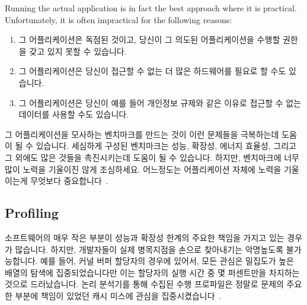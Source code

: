 Running the actual application is in fact the best approach where it is practical.
Unfortunately, it is often impractical for the following reasons:
\fi

\begin{enumerate}
\item	그 어플리케이션은 독점된 것이고, 당신이 그 의도된 어플리케이션을 수행할
	권한을 갖고 있지 못할 수 있습니다.
\item	그 어플리케이션은 당신이 접근할 수 없는 더 많은 하드웨어를 필요로 할
	수도 있습니다.
\item	그 어플리케이션은 당신이 예를 들어 개인정보 규제와 같은 이유로 접근할
	수 없는 데이터를 사용할 수도 있습니다.

\end{enumerate}

그 어플리케이션을 모사하는 벤치마크를 만드는 것이 이런 문제들을 극복하는데
도움이 될 수 있습니다.
세심하게 구성된 벤치마크는 성능, 확장성, 에너지 효율성, 그리고 그 외에도 많은
것들을 촉진시키는데 도움이 될 수 있습니다.
하지만, 벤치마크에 너무 많이 노력을 기울이진 않게 조심하세요.
어느정도는 어플리케이션 자체에 노력을 기울이는게 무엇보다
중요합니다~\cite{Gray91}.

\subsection{Profiling}
\label{sec:debugging:Profiling}

소프트웨어의 매우 작은 부분이 성능과 확장성 한계의 주요한 책임을 가지고 있는
경우가 많습니다.
하지만, 개발자들이 실제 병목지점을 손으로 찾아내기는 악명높도록 불가능합니다.
예를 들어, 커널 버퍼 할당자의 경우에 있어서, 모든 관심은 밀집도가 높은 배열의
탐색에 집중되었습니다만 이는 할당자의 실행 시간 중 몇 퍼센트만을 차지하는
것으로 드러났습니다.
논리 분석기를 통해 수집된 수행 프로파일은 정말로 문제의 주요한 부분에 책임이
있었던 캐시 미스에 관심을 집중시켰습니다~\cite{McKenney93}.

